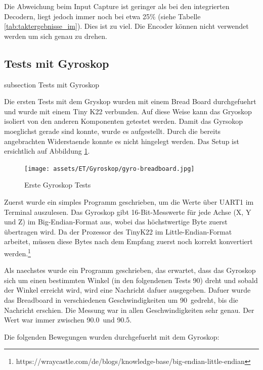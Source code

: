 Die Abweichung beim Input Capture ist geringer als bei den integrierten Decodern, liegt jedoch immer noch bei etwa 25\% (siehe Tabelle \ref{tab:taktergebnisse_im}). Dies ist zu viel. Die Encoder können nicht verwendet werden um sich genau zu drehen.



\newpage
\subsection*{Tests mit Gyroskop}\label{drehen-gyro}
    {subsection}
    {Tests mit Gyroskop}

Die ersten Tests mit dem Gryskop wurden mit einem Bread Board durchgefuehrt und wurde mit einem Tiny K22 verbunden. Auf diese Weise kann das Gryoskop isoliert von den anderen Komponenten getestet werden. Damit das Gyrsokop moeglichst gerade sind konnte, wurde es aufgestellt. Durch die bereits angebrachten Widerstaende konnte es nicht hingelegt werden. Das Setup ist ersichtlich auf Abbildung \ref{img:gyro-tests-1}.

\begin{figure}[H]
\centering
\texttt{[image: assets/ET/Gyroskop/gyro-breadboard.jpg]}
\caption{Erste Gyroskop Tests}
\label{img:gyro-tests-1}
\end{figure}

Zuerst wurde ein simples Programm geschrieben, um die Werte über UART1 im Terminal auszulesen. Das Gyroskop gibt 16-Bit-Messwerte für jede Achse (X, Y und Z) im Big-Endian-Format aus, wobei das höchstwertige Byte zuerst übertragen wird. Da der Prozessor des TinyK22 im Little-Endian-Format arbeitet, müssen diese Bytes nach dem Empfang zuerst noch korrekt konvertiert werden.\footnote{https://wraycastle.com/de/blogs/knowledge-base/big-endian-little-endian}

Als naechstes wurde ein Programm geschrieben, das erwartet, dass das Gyroskop sich um einen bestimmten Winkel (in den folgendenen Tests 90\textdegree) dreht und sobald der Winkel erreicht wird, wird eine Nachricht dafuer ausgegeben. Dafuer wurde das Breadboard in verschiedenen Geschwindigkeiten um 90\textdegree \ gedreht, bis die Nachricht erschien. Die Messung war in allen Geschwindigkeiten sehr genau. Der Wert war immer zwischen 90.0\textdegree \ und 90.5\textdegree.

Die folgenden Bewegungen wurden durchgefuerht mit dem Gyroskop: 

